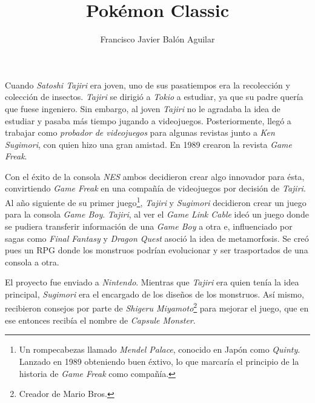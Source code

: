 \documentclass[11pt, oneside, titlepage]{article}
\title{\textbf{Pokémon Classic}}
\author{Francisco Javier Balón Aguilar}
\begin{document}
\maketitle

Cuando \textit{Satoshi Tajiri} era joven, uno de sus pasatiempos era la recolección y 
colección de insectos. \textit{Tajiri} se dirigió a \textit{Tokio} a estudiar, ya que su 
padre quería que fuese ingeniero. Sin embargo, al joven \textit{Tajiri} no le agradaba la 
idea de estudiar y pasaba más tiempo jugando a videojuegos. Posteriormente, llegó a trabajar 
como \textit{probador de videojuegos} para algunas revistas junto a \textit{Ken Sugimori}, 
con quien hizo una gran amistad. En 1989 crearon la revista \textit{Game Freak}.

Con el éxito de la consola \textit{NES} ambos decidieron crear algo innovador para ésta, 
convirtiendo \textit{Game Freak} en una compañía de videojuegos por decisión de \textit{Tajiri}.
Al año siguiente de su primer juego\footnote{
    Un rompecabezas llamado \textit{Mendel Palace}, conocido en Japón como \textit{Quinty}. 
    Lanzado en 1989 obteniendo buen éxtivo, lo que marcaría el principio de la historia de 
    \textit{Game Freak} como compañía.
}, \textit{Tajiri} y \textit{Sugimori} decidieron crear un juego para la consola \textit{Game Boy}.
\textit{Tajiri}, al ver el \textit{Game Link Cable} ideó un juego donde se pudiera transferir 
información de una \textit{Game Boy} a otra e, influenciado por sagas como \textit{Final Fantasy}
y \textit{Dragon Quest} asoció la idea de metamorfosis. Se creó pues un RPG donde los 
monstruos podrían evolucionar y ser trasportados de una consola a otra.

El proyecto fue enviado a \textit{Nintendo}. Mientras que \textit{Tajiri} era quien tenía 
la idea principal, \textit{Sugimori} era el encargado de los diseños de los monstruos. Así mismo, 
recibieron consejos por parte de \textit{Shigeru Miyamoto}\footnote{
    Creador de Mario Bros.
} para mejorar el juego, que en ese entonces recibía el nombre de \textit{Capsule Monster}.
\end{document}
